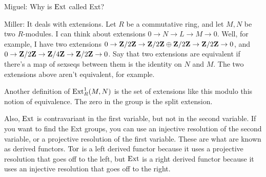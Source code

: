 \begin{remark}
Miguel: Why is $\operatorname{Ext}$ called Ext?

Miller: It deals with extensions. Let $R$ be a commutative ring, and let $M,N$ be two $R$-modules. I can think about extensions $0\to N\to L\to M\to 0$. Well, for example, I have two extensions $0\to\mathbf Z/2\mathbf Z\to\mathbf Z/2\mathbf Z\oplus\mathbf Z/2\mathbf Z\to\mathbf Z/2\mathbf Z\to 0$, and $0\to \mathbf Z/2\mathbf Z\to\mathbf Z/4\mathbf Z\to\mathbf Z/2\mathbf Z\to 0$. Say that two extensions are equivalent if there's a map of sexseqs between them is the identity on $N$ and $M$. The two extensions above aren't equivalent, for example.

Another definition of $\operatorname{Ext}^1_R(M,N)$ is the set of extensions like this modulo this notion of equivalence. The zero in the group is the split extension.

Also, $\operatorname{Ext}$ is contravariant in the first variable, but not in the second variable. If you want to find the Ext groups, you can use an injective resolution of the second variable, or a projective resolution of the first variable. These are what are known as derived functors. $\operatorname{Tor}$ is a left derived functor because it uses a projective resolution that goes off to the left, but $\operatorname{Ext}$ is a right derived functor because it uses an injective resolution that goes off to the right.
\end{remark}
